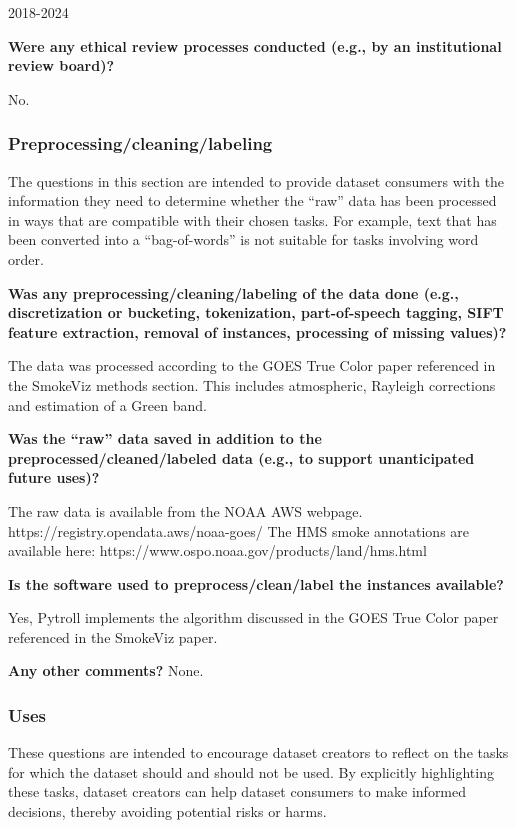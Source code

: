 \documentclass{article}
\begin{document}
2018-2024

\textbf{Were any ethical review processes conducted (e.g., by an institutional review board)?}

No.


\subsubsection{Preprocessing/cleaning/labeling}


The questions in this section are intended to provide dataset consumers with the information they need to determine whether the “raw” data has been processed in ways that are compatible with their chosen tasks. For example, text that has been converted into a “bag-of-words” is not suitable for tasks involving word order.

\textbf{Was any preprocessing/cleaning/labeling of the data done (e.g., discretization or bucketing, tokenization, part-of-speech tagging, SIFT feature extraction, removal of instances, processing of missing values)?}

The data was processed according to the GOES True Color paper referenced in the SmokeViz methods section. This includes atmospheric, Rayleigh corrections and estimation of a Green band.

\textbf{Was the “raw” data saved in addition to the preprocessed/cleaned/labeled data (e.g., to support unanticipated future uses)?}

The raw data is available from the NOAA AWS webpage.
https://registry.opendata.aws/noaa-goes/
The HMS smoke annotations are available here:
https://www.ospo.noaa.gov/products/land/hms.html

\textbf{Is the software used to preprocess/clean/label the instances available?}


Yes, Pytroll implements the algorithm discussed in the GOES True Color paper referenced in the SmokeViz paper.

\textbf{Any other comments?}
None.

\subsubsection{Uses}

These questions are intended to encourage dataset creators to reflect on the tasks for which the dataset should and should not be used. By explicitly highlighting these tasks, dataset creators can help dataset consumers to make informed decisions, thereby avoiding potential risks or harms.
\end{document}

